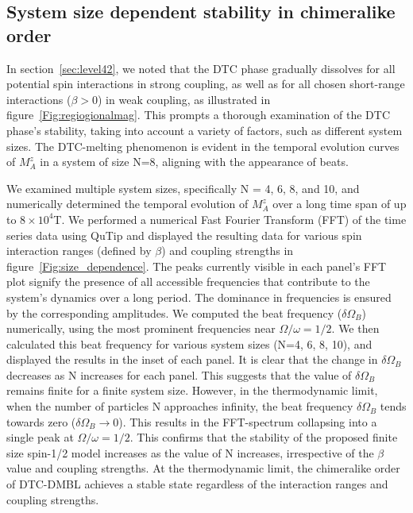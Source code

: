 \documentclass[12pt]{iopart}
\begin{document}
\subsection{\label{sec:level43} System size dependent stability in chimeralike order}
In section~\ref{sec:level42}, we noted that the DTC phase gradually dissolves for all potential spin interactions in strong coupling, as well as for all chosen short-range interactions ($\beta > 0$) in weak coupling, as illustrated in figure~\ref{Fig:regiogionalmag}. This prompts a thorough examination of the DTC phase's stability, taking into account a variety of factors, such as different system sizes. The DTC-melting phenomenon is evident in the temporal evolution curves of $M^z_A$ in a system of size N=8, aligning with the appearance of beats.

We examined multiple system sizes, specifically N = 4, 6, 8, and 10, and numerically determined the temporal evolution of $M^z_A$ over a long time span of up to $8\times10^4$T. We performed a numerical Fast Fourier Transform (FFT) of the time series data using QuTip \cite{Johansson2013} and displayed the resulting data for various spin interaction ranges (defined by $\beta$) and coupling strengths in figure~\ref{Fig:size_dependence}. The peaks currently visible in each panel's FFT plot signify the presence of all accessible frequencies that contribute to the system's dynamics over a long period. The dominance in frequencies is ensured by the corresponding amplitudes. We computed the beat frequency ($\delta\Omega_B$) numerically, using the most prominent frequencies near $\Omega/\omega = 1/2$. We then calculated this beat frequency for various system sizes (N=4, 6, 8, 10), and displayed the results in the inset of each panel. It is clear that the change in $\delta\Omega_B$ decreases as N increases for each panel. This suggests that the value of $\delta\Omega_B$ remains finite for a finite system size. However, in the thermodynamic limit, when the number of particles N approaches infinity, the beat frequency $\delta\Omega_B$ tends towards zero ($\delta\Omega_B\rightarrow 0$). This results in the FFT-spectrum collapsing into a single peak at $\Omega/\omega = 1/2$. This confirms that the stability of the proposed finite size spin-1/2 model increases as the value of N increases, irrespective of the $\beta$ value and coupling strengths. At the thermodynamic limit, the chimeralike order of DTC-DMBL achieves a stable state regardless of the interaction ranges and coupling strengths.
\end{document}
